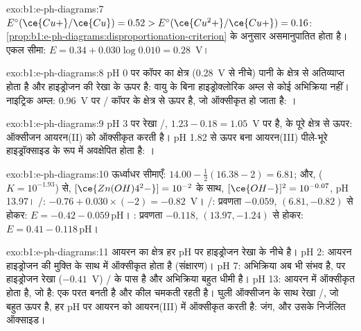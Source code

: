 \begin{solution}{exo:b1:e-ph-diagrams:7}
$E^\circ(\ce{Cu+}/\ce{Cu}) = 0.52 > E^\circ(\ce{Cu^2+}/\ce{Cu+}) = 0.16$:
\cref{prop:b1:e-ph-diagrams:disproportionation-criterion} के अनुसार 
असमानुपातित होता है। एकल सीमा: $E = 0.34 + 0.030\log 0.010 =
0.28$~V।
\end{solution}

\begin{solution}{exo:b1:e-ph-diagrams:8}
pH 0 पर कॉपर का क्षेत्र (0.28~V से नीचे) पानी के क्षेत्र से अतिव्याप्त होता है और
हाइड्रोजन की रेखा के ऊपर है: वायु के बिना हाइड्रोक्लोरिक अम्ल से कोई अभिक्रिया
नहीं। नाइट्रिक अम्ल: 0.96~V पर / कॉपर के
क्षेत्र से ऊपर है, जो ऑक्सीकृत हो जाता है:
।
\end{solution}

\begin{solution}{exo:b1:e-ph-diagrams:9}
pH 3 पर रेखा /, $1.23 - 0.18 = 1.05$~V पर है,  के
पूरे क्षेत्र से ऊपर: ऑक्सीजन आयरन(II) को ऑक्सीकृत करती है। pH 1.82 से ऊपर
बना आयरन(III) पीले-भूरे हाइड्रॉक्साइड के रूप में अवक्षेपित होता है:
।
\end{solution}

\begin{solution}{exo:b1:e-ph-diagrams:10}
ऊर्ध्वाधर सीमाएँ: $14.00 - \frac12(16.38 - 2) = 6.81$; और,
 ($K = 10^{-1.93}$) से,
$[\ce{Zn(OH)4^2-}] = 10^{-2}$ के साथ, $[\ce{OH-}]^2 = 10^{-0.07}$, pH 13.97।
/: $-0.76 + 0.030 \times (-2) = -0.82$~V। /:
प्रवणता $-0.059$, $(6.81, -0.82)$ से होकर: $E = -0.42 - 0.059\,\mathrm{pH}$।
: प्रवणता $-0.118$,
$(13.97, -1.24)$ से होकर: $E = 0.41 - 0.118\,\mathrm{pH}$।
\end{solution}

\begin{solution}{exo:b1:e-ph-diagrams:11}
आयरन का क्षेत्र हर pH पर हाइड्रोजन रेखा के नीचे है। pH 2: आयरन
हाइड्रोजन की मुक्ति के साथ  में ऑक्सीकृत होता है (संक्षारण)। pH 7:
अभिक्रिया अब भी संभव है, पर हाइड्रोजन रेखा ($-0.41$~V)
/ के पास है और अभिक्रिया बहुत धीमी है। pH 13: आयरन
 में ऑक्सीकृत होता है, जो  है: एक परत बनती है और
कील चमकती रहती है। घुली ऑक्सीजन के साथ रेखा /,
जो बहुत ऊपर है, हर pH पर आयरन को आयरन(III) में ऑक्सीकृत करती है: जंग, 
और उसके निर्जलित ऑक्साइड।
\end{solution}

